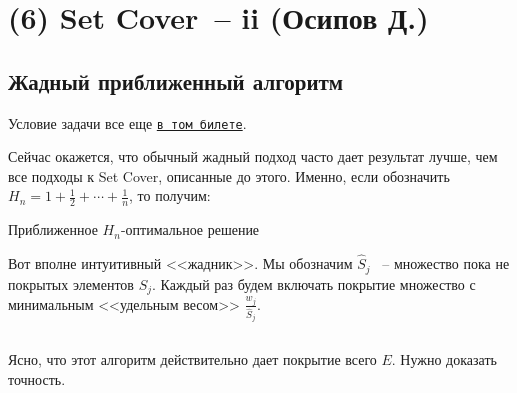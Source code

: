 \section{(6) Set Cover~-- ii (Осипов Д.)}
\subsection{Жадный приближенный алгоритм}
Условие задачи все еще \hyperlink{setcover}{\texttt{в том билете}}.

Сейчас окажется, что обычный жадный подход часто дает результат лучше, чем все подходы к Set Cover, описанные до этого. Именно, если обозначить $H_n = 1 + \frac{1}{2} + \cdots + \frac{1}{n}$, то получим:

\begin{algodescription}{Приближенное $H_n$-оптимальное решение}

Вот вполне интуитивный <<жадник>>. Мы обозначим $\hat{S}_j$ ~-- множество пока не покрытых элементов $S_j$. Каждый раз будем включать покрытие множество с минимальным <<удельным весом>> $\frac{w_j}{\hat{S}_j}$.

\begin{algorithm}[H]
	\DontPrintSemicolon
\end{algorithm}
$ $
\end{algodescription}

Ясно, что этот алгоритм действительно дает покрытие всего $E$. Нужно доказать точность.

